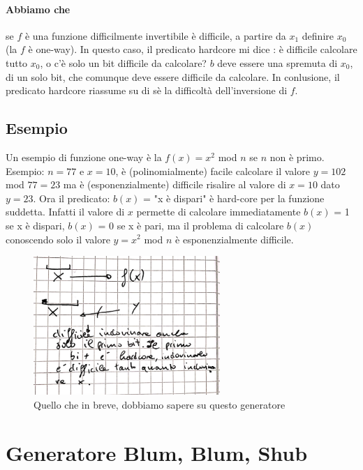 \paragraph{Abbiamo che} se $f$ è una funzione difficilmente invertibile è difficile, a partire da $x_1$ definire $x_0$ (la $f$ è one-way). In questo caso, il predicato hardcore mi dice : è difficile calcolare tutto $x_0$, o c'è solo un bit difficile da calcolare? $b$ deve essere una spremuta di $x_0$, di un solo bit, che comunque deve essere difficile da calcolare. In conlusione, il predicato hardcore riassume su di sè la difficoltà dell'inversione di $f$.

\subsection{Esempio}

Un esempio di funzione one-way è la $f(x) = x^2$ mod $n$ se
$n$ non è primo. Esempio: $n = 77$ e $x = 10$, è (polinomialmente) facile calcolare il valore $y = 102$ mod $77 = 23$ ma è (esponenzialmente) difficile risalire al valore di $x = 10$ dato $y = 23$. Ora il predicato: $b(x)$ = "x è dispari" è hard-core per la funzione suddetta. Infatti il valore di $x$ permette di calcolare immediatamente $b(x)$ = 1 se x è dispari, $b(x)$ = 0 se x è pari, ma il problema di calcolare $b(x)$ conoscendo solo il valore $y = x^2$ mod $n$ è esponenzialmente difficile.

\begin{figure}[htp]
	\includegraphics[width=200pt]{./img/funzioni-one-way.png}
	\caption{Quello che in breve, dobbiamo sapere su questo generatore}
	\label{img:funzioni-one-way}
\end{figure}

\newpage

\section{Generatore Blum, Blum, Shub}

